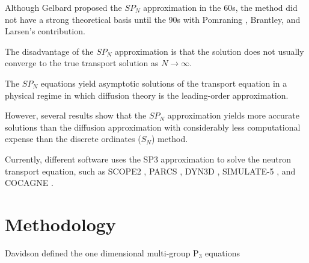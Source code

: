 \documentclass{anstrans}
\begin{document}
Although Gelbard proposed the $SP_N$ approximation in the 60s, the method did not have a strong theoretical basis until the 90s with Pomraning \cite{pomraning_asymptotic_1993}, Brantley, and Larsen's \cite{brantley_simplifiedP3_2000} contribution.


The disadvantage of the $SP_N$ approximation is that the solution does not usually converge to the true transport solution as $N \rightarrow \infty$.

The $SP_N$ equations yield asymptotic solutions of the transport equation in a physical regime in which diffusion theory is the leading-order approximation.



However, several results \cite{mui_modified_1987} \cite{beckert_development_2007} \cite{fliscounakis_potential_2012} \cite{ryu_finite_2013} \cite{khosravi_mirzaee_reactor_2019} show that the $SP_N$ approximation yields more accurate solutions than the diffusion approximation with considerably less computational expense than the discrete ordinates ($S_N$) method.





Currently, different software uses the SP3 approximation to solve the neutron transport equation, such as SCOPE2 \cite{tatsumi_object-oriented_2002}, PARCS \cite{downar_parcs_2004}, DYN3D \cite{beckert_development_2007}, SIMULATE-5 \cite{bahadir_studsviks_2009}, and COCAGNE \cite{fliscounakis_potential_2012}.




\section{Methodology}

Davidson \cite{davidson_neutron_1957} defined the one dimensional multi-group P$_3$ equations 
\end{document}
